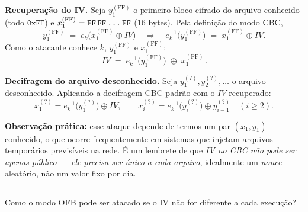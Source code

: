 \documentclass[12pt,a4paper]{article}
\newcommand{\exercicio}[1]{%
    \par\vspace{1.2em}
    \noindent
    {\color{black!55}\rule[-0.25em]{3pt}{1.6em}}%
    \hspace{0.6em}{\Large\bfseries Exerc\'{i}cio #1}
    \par\vspace{-0.4em}
    \noindent{\color{black!35}\rule{\textwidth}{0.4pt}}
    \par\vspace{0.35em}
}
\newenvironment{resposta}{%
    \begin{respostabox}
    \color{red!70!black}\sloppy
}{%
    \end{respostabox}
}
\begin{document}
\begin{resposta}

\textbf{Recuperação do IV.} Seja $y_1^{\mathrm{(FF)}}$ o primeiro bloco cifrado do arquivo conhecido (todo $\texttt{0xFF}$) e $x_1^{\mathrm{(FF)}} = \texttt{FF\,FF\,\ldots\,FF}$ (16 bytes). Pela definição do modo CBC,
\[
y_1^{\mathrm{(FF)}} \;=\; e_k\bigl(x_1^{\mathrm{(FF)}} \oplus IV\bigr) \quad\Longrightarrow\quad
e_k^{-1}\!\bigl(y_1^{\mathrm{(FF)}}\bigr) \;=\; x_1^{\mathrm{(FF)}} \oplus IV.
\]
Como o atacante conhece $k$, $y_1^{\mathrm{(FF)}}$ e $x_1^{\mathrm{(FF)}}$:
\[
\boxed{\,IV \;=\; e_k^{-1}\!\bigl(y_1^{\mathrm{(FF)}}\bigr) \;\oplus\; x_1^{\mathrm{(FF)}}\,.}
\]

\textbf{Decifragem do arquivo desconhecido.} Seja $y_1^{\mathrm{(?)}}, y_2^{\mathrm{(?)}}, \ldots$ o arquivo desconhecido. Aplicando a decifragem CBC padrão com o $IV$ recuperado:
\[
x_1^{\mathrm{(?)}} = e_k^{-1}\!\bigl(y_1^{\mathrm{(?)}}\bigr) \oplus IV, \qquad
x_i^{\mathrm{(?)}} = e_k^{-1}\!\bigl(y_i^{\mathrm{(?)}}\bigr) \oplus y_{i-1}^{\mathrm{(?)}} \quad (i \geq 2).
\]

\textbf{Observação prática:} esse ataque depende de termos um par $(x_1, y_1)$ conhecido, o que ocorre frequentemente em sistemas que injetam arquivos temporários previsíveis na rede. É um lembrete de que \emph{IV no CBC não pode ser apenas público — ele precisa ser \emph{único} a cada arquivo}, idealmente um \textit{nonce} aleatório, não um valor fixo por dia.

\end{resposta}

\exercicio{12}
Como o modo OFB pode ser atacado se o IV não for diferente a cada execução?
\end{document}
